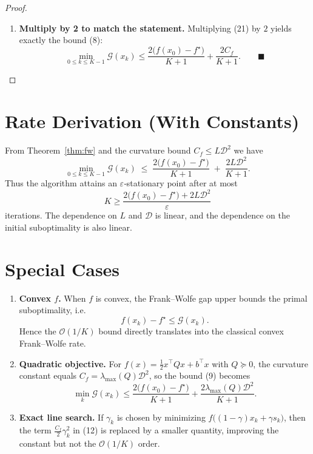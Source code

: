 \documentclass{article}
\newcommand{\gap}{\mathcal{G}}
\newcommand{\diam}{\mathcal{D}}
\newcommand{\curv}{C_f}
\begin{document}
\begin{proof}
\begin{enumerate}[label=[Step \arabic*], leftmargin=*, align=left]
\item \textbf{Multiply by 2 to match the statement.}
    Multiplying (21) by $2$ yields exactly the bound (8):
    \[
    \min_{0\le k\le K-1}\gap(x_k)
    \le \frac{2\bigl(f(x_0)-f^\star\bigr)}{K+1}
       +\frac{2\curv}{K+1}.
    \qquad\blacksquare
    \]
\end{enumerate}
\end{proof}

\section*{Rate Derivation (With Constants)}
From Theorem~\ref{thm:fw} and the curvature bound $\curv\le L\diam^{2}$ we have
\[
\min_{0\le k\le K-1}\gap(x_k)
\;\le\;
\frac{2\bigl(f(x_0)-f^\star\bigr)}{K+1}
\;+\;
\frac{2L\diam^{2}}{K+1}.
\]
Thus the algorithm attains an $\varepsilon$‑stationary point after at most
\[
K \ge \frac{2\bigl(f(x_0)-f^\star\bigr)+2L\diam^{2}}{\varepsilon}
\]
iterations.  The dependence on $L$ and $\diam$ is linear, and the dependence
on the initial suboptimality is also linear.

\section*{Special Cases}
\begin{enumerate}[label=\alph*.]
\item \textbf{Convex $f$.}  When $f$ is convex, the Frank–Wolfe gap upper bounds the
primal suboptimality, i.e.
\[
f(x_k)-f^\star \le \gap(x_k).
\]
Hence the $\mathcal O(1/K)$ bound directly translates into the classical
convex Frank–Wolfe rate.
\item \textbf{Quadratic objective.}  For $f(x)=\tfrac12 x^\top Q x + b^\top x$ with
$Q\succeq0$, the curvature constant equals $C_f = \lambda_{\max}(Q)\diam^{2}$,
so the bound (9) becomes
\[
\min_{k}\gap(x_k)\le
\frac{2\bigl(f(x_0)-f^\star\bigr)}{K+1}
+\frac{2\lambda_{\max}(Q)\diam^{2}}{K+1}.
\]
\item \textbf{Exact line search.}  If $\gamma_k$ is chosen by minimizing
$f\bigl((1-\gamma)x_k+\gamma s_k\bigr)$, then the term $\frac{\curv}{2}\gamma_k^{2}$
in (12) is replaced by a smaller quantity, improving the constant but not
the $\mathcal O(1/K)$ order.
\end{enumerate}

\end{document}
